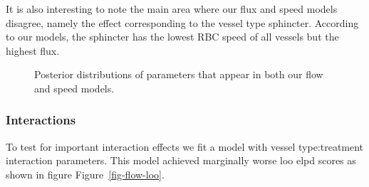 \documentclass[
  letterpaper,
  DIV=11,
  numbers=noendperiod,
  oneside]{scrartcl}
\theoremstyle{plain}
\theoremstyle{remark}
\begin{document}
It is also interesting to note the main area where our flux and speed
models disagree, namely the effect corresponding to the vessel type
sphincter. According to our models, the sphincter has the lowest RBC
speed of all vessels but the highest flux.

\begin{figure}


\caption{\label{fig-flow-shared}Posterior distributions of parameters
that appear in both our flow and speed models.}

\end{figure}%

\subsubsection{Interactions}\label{interactions}

To test for important interaction effects we fit a model with vessel
type:treatment interaction parameters. This model achieved marginally
worse loo elpd scores as shown in figure Figure~\ref{fig-flow-loo}.
\end{document}
